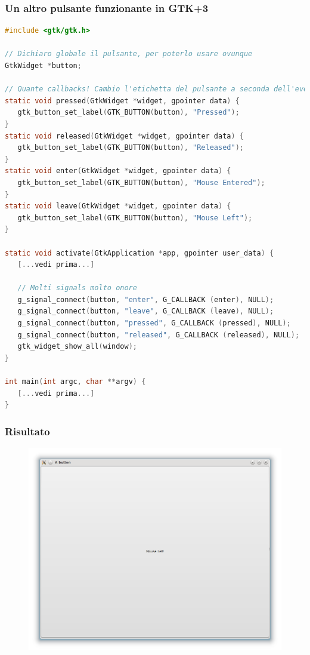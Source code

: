 \documentclass{beamer}
\begin{document}
\begin{frame}[fragile]
\frametitle{Un altro pulsante \textbf{funzionante} in GTK+3}
\begin{lstlisting}[language=C]
#include <gtk/gtk.h>

// Dichiaro globale il pulsante, per poterlo usare ovunque
GtkWidget *button;

// Quante callbacks! Cambio l'etichetta del pulsante a seconda dell'evento
static void pressed(GtkWidget *widget, gpointer data) {
   gtk_button_set_label(GTK_BUTTON(button), "Pressed");
}
static void released(GtkWidget *widget, gpointer data) {
   gtk_button_set_label(GTK_BUTTON(button), "Released");
}
static void enter(GtkWidget *widget, gpointer data) {
   gtk_button_set_label(GTK_BUTTON(button), "Mouse Entered");
}
static void leave(GtkWidget *widget, gpointer data) {
   gtk_button_set_label(GTK_BUTTON(button), "Mouse Left");
}

static void activate(GtkApplication *app, gpointer user_data) {
   [...vedi prima...]

   // Molti signals molto onore
   g_signal_connect(button, "enter", G_CALLBACK (enter), NULL);
   g_signal_connect(button, "leave", G_CALLBACK (leave), NULL);
   g_signal_connect(button, "pressed", G_CALLBACK (pressed), NULL);
   g_signal_connect(button, "released", G_CALLBACK (released), NULL);
   gtk_widget_show_all(window);
}

int main(int argc, char **argv) {
   [...vedi prima...]
}
\end{lstlisting}
\end{frame}

\begin{frame}
\frametitle{Risultato}
\begin{figure}
 \includegraphics[width=0.99\columnwidth]{img/4}
\end{figure}
\end{frame}
\end{document}
